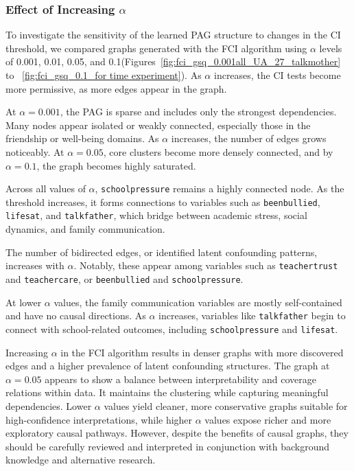 \documentclass[main.tex]{subfiles}
\begin{document}
\subsubsection{Effect of Increasing \texorpdfstring{$\alpha$}{alpha}}

To investigate the sensitivity of the learned PAG structure to changes in the CI threshold, we compared graphs generated with the FCI algorithm using $\alpha$ levels of 0.001, 0.01, 0.05, and 0.1(Figures~\ref{fig:fci_gsq_0.001all_UA_27_talkmother} to ~\ref{fig:fci_gsq_0.1_for time experiment}). As $\alpha$ increases, the CI tests become more permissive, as more edges appear in the graph.

At $\alpha = 0.001$, the PAG is sparse and includes only the strongest dependencies. Many nodes appear isolated or weakly connected, especially those in the friendship or well-being domains. As $\alpha$ increases, the number of edges grows noticeably. At $\alpha=0.05$, core clusters become more densely connected, and by $\alpha=0.1$, the graph becomes highly saturated.

Across all values of $\alpha$, \texttt{schoolpressure} remains a highly connected node. As the threshold increases, it forms connections to variables such as \texttt{beenbullied}, \texttt{lifesat}, and \texttt{talkfather}, which bridge between academic stress, social dynamics, and family communication.

 The number of bidirected edges, or identified latent confounding patterns, increases with $\alpha$. Notably, these appear among variables such as \texttt{teachertrust} and \texttt{teachercare}, or \texttt{beenbullied} and \texttt{schoolpressure}. 

At lower $\alpha$ values, the family communication variables are mostly self-contained and have no causal directions. As $\alpha$ increases, variables like \texttt{talkfather} begin to connect with school-related outcomes, including \texttt{schoolpressure} and \texttt{lifesat}. 

Increasing $\alpha$ in the FCI algorithm results in denser graphs with more discovered edges and a higher prevalence of latent confounding structures. The graph at $\alpha = 0.05$ appears to show a balance between interpretability and coverage relations within data. It maintains the clustering while capturing meaningful dependencies. Lower $\alpha$ values yield cleaner, more conservative graphs suitable for high-confidence interpretations, while higher $\alpha$ values expose richer and more exploratory causal pathways. However, despite the benefits of causal graphs, they should be carefully reviewed and interpreted in conjunction with background knowledge and alternative research.
\end{document}
